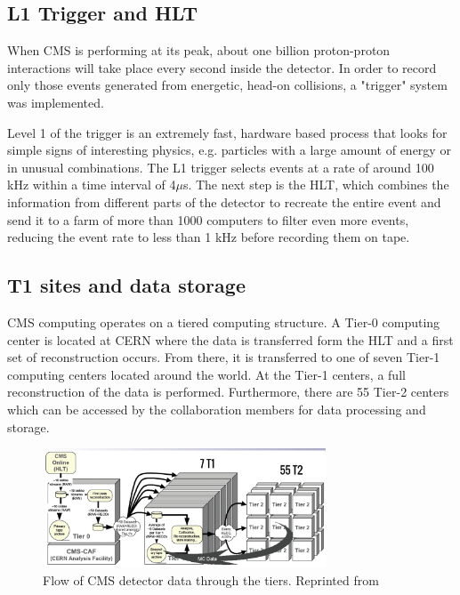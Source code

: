 \subsection{L1 Trigger and HLT}
 When CMS is performing at its peak, about one billion proton-proton interactions will take place every second inside the detector. In order to record only those events generated from energetic, head-on collisions, a "trigger" system was implemented.

Level 1 of the trigger is an extremely fast, hardware based process that looks for simple signs of interesting physics, e.g. particles with a large amount of energy or in unusual combinations. The L1 trigger selects events at a rate of around 100 kHz within a time interval of 4$\mu$s. The next step is the HLT, which combines the information from different parts of the detector to recreate the entire event and send it to a farm of more than 1000 computers to filter even more events, reducing the event rate to less than 1 kHz before recording them on tape.

\subsection{T1 sites and data storage}

CMS computing operates on a tiered computing structure. A Tier-0 computing center is located at CERN where the data is transferred form the HLT and a first set of reconstruction occurs. From there, it is transferred to one of seven Tier-1 computing centers located around the world. At the Tier-1 centers, a full reconstruction of the data is performed. Furthermore, there are 55 Tier-2 centers which can be accessed by the collaboration members for data processing and storage.

 \begin{figure}[H]
 	\centering
 	\includegraphics[width=0.75\textwidth]{figures/dataflowtiers_MC.png}
 	\singlespace
 	\caption{Flow of CMS detector data through the tiers. Reprinted from \cite{CMSdatatier}}
 	\label{fig:datatier}
 \end{figure}

